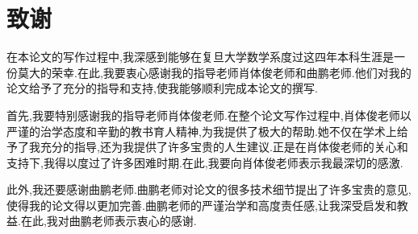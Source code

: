 \documentclass[notitlepage,cs4size,punct,oneside]{ctexrep}
\numberwithin{equation}{chapter}
\theoremstyle{mystyle}
\begin{document}
\chapter*{\heiti 致谢}
在本论文的写作过程中,我深感到能够在复旦大学数学系度过这四年本科生涯是一份莫大的荣幸.在此,我要衷心感谢我的指导老师肖体俊老师和曲鹏老师.他们对我的论文给予了充分的指导和支持,使我能够顺利完成本论文的撰写.

首先,我要特别感谢我的指导老师肖体俊老师.在整个论文写作过程中,肖体俊老师以严谨的治学态度和辛勤的教书育人精神,为我提供了极大的帮助.她不仅在学术上给予了我充分的指导,还为我提供了许多宝贵的人生建议.正是在肖体俊老师的关心和支持下,我得以度过了许多困难时期.在此,我要向肖体俊老师表示我最深切的感激.

此外,我还要感谢曲鹏老师.曲鹏老师对论文的很多技术细节提出了许多宝贵的意见,使得我的论文得以更加完善.曲鹏老师的严谨治学和高度责任感,让我深受启发和教益.在此,我对曲鹏老师表示衷心的感谢.
\footnotesize
\end{document}
